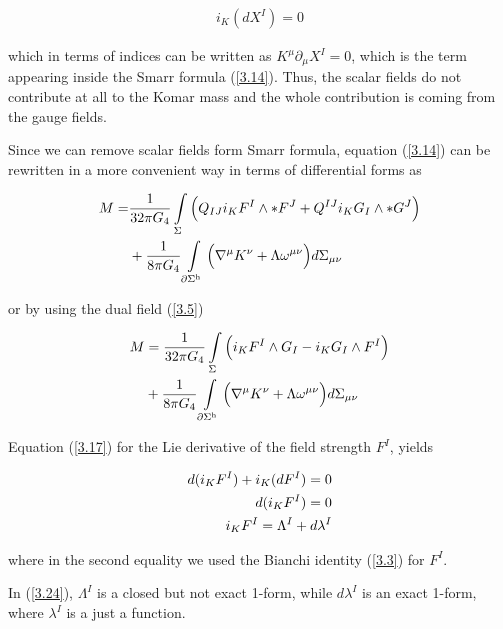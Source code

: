 \documentclass[a4paper,notitlepage]{report}
\begin{document}
\begin{align}\label{3.21}
i_{K} (d X^I) = 0
\end{align}

\vspace{0.5em}
which in terms of indices can be written as $K^\mu \partial_\mu X^I = 0$, which is the term appearing inside the Smarr formula (\ref{3.14}). Thus, the scalar fields do not contribute at all to the Komar mass and the whole contribution is coming from the gauge fields.

Since we can remove scalar fields form Smarr formula, equation (\ref{3.14}) can be rewritten in a more convenient way in terms of differential forms as

\begin{align} \label{3.22}
M =& \frac{1}{32\pi G_{4}} \int\limits_{\Sigma} \Big( Q_{IJ} i_{K}F^I \wedge * F^{J} + Q^{IJ} i_{K} G_{I} \wedge * G^J \Big) \notag\\
&+ \frac{1}{8\pi G_{4}} \int\limits_{\partial \Sigma^{\text{h}}} \Big( \nabla^{\mu} K^{\nu} + \Lambda \omega^{\mu\nu} \Big) d\Sigma_{\mu\nu}
\end{align}

\vspace{0.5 em}
or by using the dual field (\ref{3.5})

\begin{align} \label{3.23}
M &= \frac{1}{32\pi G_{4}} \int\limits_{\Sigma} \Big( i_{K}F^I \wedge G_I - i_{K} G_{I} \wedge F^I \Big) \\ \notag
&+ \frac{1}{8\pi G_{4}} \int\limits_{\partial \Sigma^{\text{h}}} \Big( \nabla^{\mu} K^{\nu} + \Lambda \omega^{\mu\nu} \Big) d\Sigma_{\mu\nu}
\end{align}

\vspace{0.5 em}
Equation (\ref{3.17}) for the Lie derivative of the field strength $F^I$, yields

\begin{align} \label{3.24}
d(i_{K} F^I)  + i_{K} (dF^I) = 0 \notag\\
d(i_{K} F^I) = 0  \notag\\
i_{K} F^I = \Lambda^I + d\lambda^I
\end{align}

\vspace{0.5em}
where in the second equality we used the Bianchi identity (\ref{3.3}) for $F^I$.

In (\ref{3.24}), $\Lambda^I$ is a closed but not exact 1-form, while $d\lambda^I$ is an exact 1-form, where $\lambda^I$ is a just a function.
\end{document}
